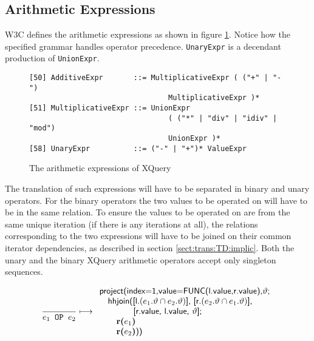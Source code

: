 \subsection{Arithmetic Expressions}
\label{sect:trans:TD:atrith}
W3C defines the arithmetic expressions as shown in figure \ref{fig:trans:TD:arithEBNF}\cite{w3c00}. Notice how the
specified grammar handles operator precedence. \texttt{UnaryExpr} is a decendant production of \texttt{UnionExpr}.

\begin{figure}[h]
\begin{Verbatim}
[50] AdditiveExpr       ::= MultiplicativeExpr ( ("+" | "-") 
                                MultiplicativeExpr )*
[51] MultiplicativeExpr ::= UnionExpr 
                                ( ("*" | "div" | "idiv" | "mod")
                                UnionExpr )*
[58] UnaryExpr          ::= ("-" | "+")* ValueExpr
\end{Verbatim}
\caption{The arithmetic expressions of XQuery}
\label{fig:trans:TD:arithEBNF}
\end{figure}

The translation of such expressions will have to be separated in binary and unary operators. For the binary
operators the two values to be operated on will have to be in the same relation. To ensure the values to be
operated on are from the same unique iteration (if there is any iterations at all), the relations corresponding to
the two expressions will have to be joined on their common iterator dependencies, as described in section
\ref{sect:trans:TD:implic}. Both the unary and the binary XQuery arithmetic operators accept only singleton
sequences.

\begin{equation}
\frac{}{e_1 \mbox{\texttt{ OP }} e_2}\longmapsto
\begin{array}{l}
\mbox{\textsf{project(index=1,value=FUNC(l.value,r.value),}}\vartheta\mbox{\textsf{;}} \\ \quad
\mbox{\textsf{hhjoin([l.}}(e_1.\vartheta\cap e_2.\vartheta)\mbox{\textsf{], [r.}}(e_2.\vartheta\cap e_1.\vartheta)
\mbox{\textsf{],}} 
\\ \quad \quad \quad \quad\mbox{\textsf{[r.value, l.value, }}\vartheta\mbox{\textsf{];}} \\ \quad \quad
\mbox{\textbf{r(}}e_1\mbox{\textbf{)}} \\ \quad \quad
\mbox{\textbf{r(}}e_2\mbox{\textbf{)}\textsf{))}}
\end{array}
\label{rule:trans:TD:arithmetic}
\end{equation}

